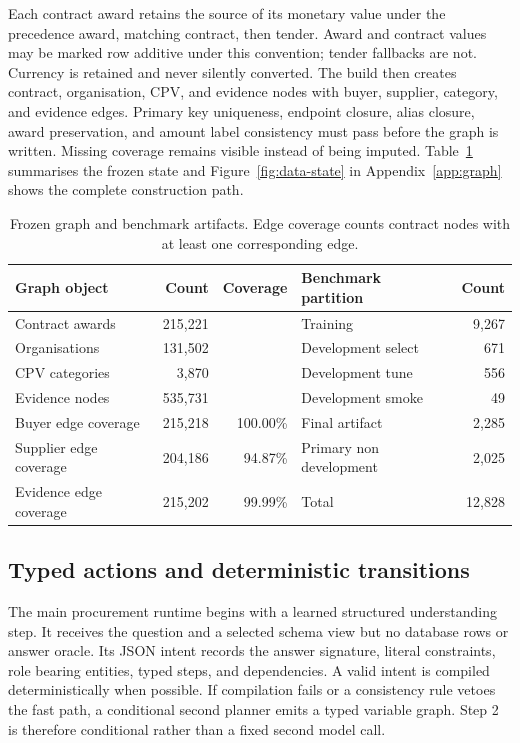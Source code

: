 \documentclass{article}
\begin{document}
Each contract award retains the source of its monetary value under the precedence award, matching
contract, then tender.  Award and contract values may be marked row additive under this convention;
tender fallbacks are not.  Currency is retained and never silently converted.  The build then
creates contract, organisation, CPV, and evidence nodes with buyer, supplier, category, and
evidence edges.  Primary key uniqueness, endpoint closure, alias closure, award preservation, and
amount label consistency must pass before the graph is written.  Missing coverage remains visible
instead of being imputed.  Table~\ref{tab:data} summarises the frozen state and
Figure~\ref{fig:data-state} in Appendix~\ref{app:graph} shows the complete construction path.

\begin{table}[t]
  \centering
  \caption{Frozen graph and benchmark artifacts.  Edge coverage counts contract nodes with at
  least one corresponding edge.}
  \label{tab:data}
  \small
  \begin{tabular}{lrr@{\qquad}lr}
    \toprule
    Graph object & Count & Coverage & Benchmark partition & Count \\
    \midrule
    Contract awards & 215,221 & & Training & 9,267 \\
    Organisations & 131,502 & & Development select & 671 \\
    CPV categories & 3,870 & & Development tune & 556 \\
    Evidence nodes & 535,731 & & Development smoke & 49 \\
    Buyer edge coverage & 215,218 & 100.00\% & Final artifact & 2,285 \\
    Supplier edge coverage & 204,186 & 94.87\% & Primary non development & 2,025 \\
    Evidence edge coverage & 215,202 & 99.99\% & Total & 12,828 \\
    \bottomrule
  \end{tabular}
\end{table}

\subsection{Typed actions and deterministic transitions}

The main procurement runtime begins with a learned structured understanding step.  It receives the
question and a selected schema view but no database rows or answer oracle.  Its JSON intent records
the answer signature, literal constraints, role bearing entities, typed steps, and dependencies.  A
valid intent is compiled deterministically when possible.  If compilation fails or a consistency
rule vetoes the fast path, a conditional second planner emits a typed variable graph.  Step 2 is
therefore conditional rather than a fixed second model call.
\end{document}
